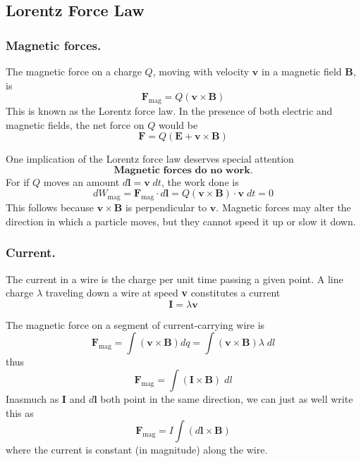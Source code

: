\documentclass[../../../main.tex]{subfiles}
\begin{document}
\subsection*{Lorentz Force Law}
\subsubsection*{Magnetic forces.} The magnetic force on a charge $Q$, moving with velocity $\mathbf{v}$ in a magnetic ﬁeld \textbf{B}, is 
\begin{equation*}
    \mathbf{F}_{\text{mag}} = Q(\mathbf{v} \times \mathbf{B})
\end{equation*}
This is known as the Lorentz force law. In the presence of both electric and magnetic ﬁelds, the net force on $Q$ would be
\begin{equation*}
    \mathbf{F}= Q(\mathbf{E}+\mathbf{v} \times \mathbf{B})
\end{equation*}

One implication of the Lorentz force law deserves special attention
\begin{equation*}
\boxed{
    \textbf{Magnetic forces do no work.}
    }
\end{equation*}
For if $Q$ moves an amount $d\mathbf{l} = \mathbf{v} \;dt$, the work done is
\begin{equation*}
    dW_{\text{mag}} = \mathbf{F}_{\text{mag}} \cdot d\mathbf{l} = Q(\mathbf{v} \times \mathbf{B}) \cdot \mathbf{v} \;dt = 0
\end{equation*}
This follows because $\mathbf{v} \times \mathbf{B}$ is perpendicular to $\mathbf{v}$. Magnetic forces may alter the direction in which a particle moves, but they cannot speed it up or slow it down.

\subsubsection*{Current.} The current in a wire is the charge per unit time passing a given point. A line charge $\lambda$ traveling down a wire at speed \textbf{v} constitutes a current
\begin{equation*}
    \mathbf{I}=\lambda\mathbf{v}
\end{equation*}

The magnetic force on a segment of current-carrying wire is
\begin{equation*}
    \mathbf{F}_{\text{mag}}=\int (\mathbf{v} \times \mathbf{B}) dq=\int (\mathbf{v} \times \mathbf{B}) \lambda\; dl
\end{equation*}
thus
\begin{equation*}
    \mathbf{F}_{\text{mag}}=\int (\mathbf{I}\times \mathbf{B})\;dl
\end{equation*}
Inasmuch as $\mathbf{I}$ and $d\mathbf{l}$ both point in the same direction, we can just as well write 
this as
\begin{equation*}
    \mathbf{F}_{\text{mag}}=I\int (d\mathbf{l}\times \mathbf{B})
\end{equation*}
where the current is constant (in magnitude) along the wire.
\end{document}

